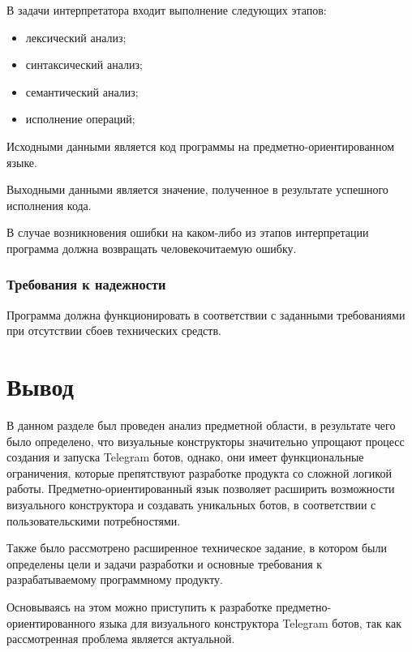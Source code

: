 В задачи интерпретатора входит выполнение следующих этапов:
\begin{itemize}
	\item лексический анализ;
	\item синтаксический анализ;
	\item семантический анализ;
	\item исполнение операций;
\end{itemize}

Исходными данными является код программы на предметно-ориентированном языке.

Выходными данными является значение, полученное в результате успешного исполнения кода.

В случае возникновения ошибки на каком-либо из этапов интерпретации программа должна возвращать человекочитаемую ошибку.



\subsubsection{Требования к надежности}

Программа должна функционировать в соответствии с заданными требованиями при отсутствии сбоев технических средств.



\section*{Вывод}

В данном разделе был проведен анализ предметной области, в результате чего было определено,
что визуальные конструкторы значительно упрощают процесс создания и запуска Telegram ботов,
однако, они имеет функциональные ограничения, которые препятствуют разработке продукта со сложной логикой работы.
Предметно-ориентированный язык позволяет расширить возможности визуального конструктора и создавать уникальных ботов,
в соответствии с пользовательскими потребностями.

Также было рассмотрено расширенное техническое задание,
в котором были определены цели и задачи разработки и основные требования к разрабатываемому программному продукту.

Основываясь на этом можно приступить к разработке предметно-ориентированного языка для визуального конструктора Telegram ботов,
так как рассмотренная проблема является актуальной.
